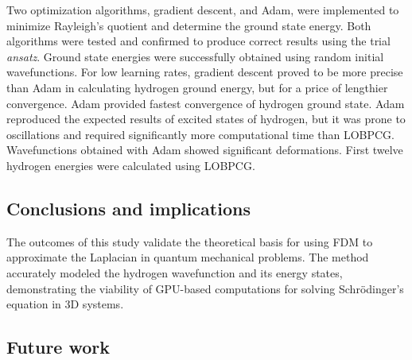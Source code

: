 Two optimization algorithms, gradient descent, and Adam, were implemented to minimize Rayleigh's quotient and determine the ground state energy. Both algorithms were tested and confirmed to produce correct results using the trial \textit{ansatz}. Ground state energies were successfully obtained using random initial wavefunctions. For low learning rates, gradient descent proved to be more precise than Adam in calculating hydrogen ground energy, but for a price of lengthier convergence. Adam provided fastest convergence of hydrogen ground state. Adam reproduced the expected results of excited states of hydrogen, but it was prone to oscillations and required significantly more computational time than LOBPCG. Wavefunctions obtained with Adam showed significant deformations. First twelve hydrogen energies were calculated using LOBPCG.

\subsection{Conclusions and implications}

%
%
%

The outcomes of this study validate the theoretical basis for using FDM to approximate the Laplacian in quantum mechanical problems. The method accurately modeled the hydrogen wavefunction and its energy states, demonstrating the viability of GPU-based computations for solving Schrödinger's equation in 3D systems.

\subsection{Future work}

